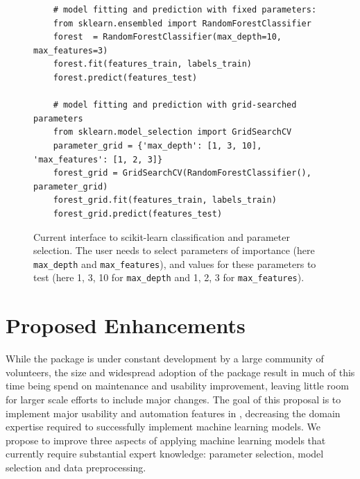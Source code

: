 \begin{figure}
    \begin{verbatim}
    # model fitting and prediction with fixed parameters:
    from sklearn.ensembled import RandomForestClassifier
    forest  = RandomForestClassifier(max_depth=10, max_features=3)
    forest.fit(features_train, labels_train)
    forest.predict(features_test)

    # model fitting and prediction with grid-searched parameters
    from sklearn.model_selection import GridSearchCV
    parameter_grid = {'max_depth': [1, 3, 10], 'max_features': [1, 2, 3]}
    forest_grid = GridSearchCV(RandomForestClassifier(), parameter_grid)
    forest_grid.fit(features_train, labels_train)
    forest_grid.predict(features_test)
    \end{verbatim}
    \vspace{-5mm}
    \label{gridsearch}
    \caption{Current interface to scikit-learn classification and parameter
        selection. The user needs to select parameters of importance (here
        \texttt{max\_depth} and \texttt{max\_features}), and values for these
        parameters to test (here 1, 3, 10 for \texttt{max\_depth} and 1, 2, 3
        for \texttt{max\_features}).}
\end{figure}

\section{Proposed Enhancements}
While the \sklearn{} package is under constant development by a large community
of volunteers, the size and widespread adoption of the package result in much of this
time being spend on maintenance and usability improvement, leaving little room
for larger scale efforts to include major changes. The goal of this proposal
is to implement major usability and automation features in \sklearn{}, decreasing
the domain expertise required to successfully implement machine learning models.
We propose to improve three aspects of applying machine learning models that
currently require substantial expert knowledge: parameter selection, model
selection and data preprocessing.

